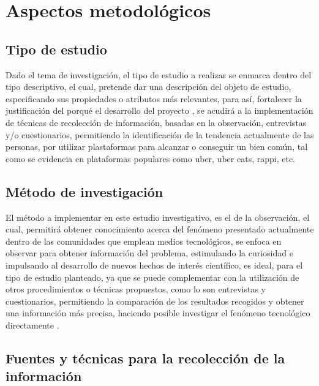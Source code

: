\section{Aspectos metodológicos}

	\subsection{Tipo de estudio}
	
	{Dado el tema de investigación, el tipo de estudio a realizar se enmarca dentro del tipo descriptivo, el cual, pretende dar una descripción del objeto de estudio, especificando sus propiedades o atributos más relevantes, para así, fortalecer la justificación del porqué el desarrollo del proyecto \cite{methoInv}, se acudirá a la implementación de técnicas de recolección de información, basadas en la observación, entrevistas y/o cuestionarios, permitiendo la identificación de la tendencia actualmente de las personas, por utilizar plastaformas para alcanzar o conseguir un bien común, tal como se evidencia en plataformas populares como uber, uber eats, rappi, etc.}
	
	
	\subsection{Método de investigación}
	
	{El método a implementar en este estudio investigativo, es el de la observación, el cual, permitirá obtener conocimiento acerca del fenómeno presentado actualmente dentro de las comunidades que emplean medios tecnológicos, se enfoca en observar para obtener información del problema, estimulando la curiosidad e impulsando al desarrollo de nuevos hechos de interés científico, es ideal, para el tipo de estudio planteado, ya que se puede complementar con la utilización de otros procedimientos o técnicas propuestos, como lo son entrevistas y cuestionarios, permitiendo la comparación de los resultados recogidos y obtener una información más precisa, haciendo posible investigar el fenómeno tecnológico directamente \cite{methoInv,metho}.}
	
	
	\subsection{Fuentes y técnicas para la recolección de la información}
	
